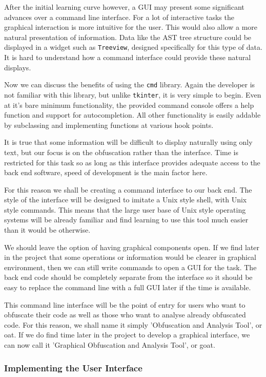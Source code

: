 \documentclass{report}
\begin{document}
After the initial learning curve however, a GUI may present some significant advances over a command line interface. For a lot of interactive
tasks the graphical interaction is more intuitive for the user. This would also allow a more natural presentation of information. Data like
the AST tree structure could be displayed in a widget such as \texttt{Treeview}, designed specifically for this type of data. It is hard to
understand how a command interface could provide these natural displays.

Now we can discuss the benefits of using the \texttt{cmd} library. Again the developer is not familiar with this library, but unlike
\texttt{tkinter}, it is very simple to begin. Even at it's bare minimum functionality, the provided command console offers a help
function and support for autocompletion. All other functionality is easily addable by subclassing and implementing functions at various
hook points.

It is true that some information will be difficult to display naturally using only text, but our focus is on the obfuscation rather than
the interface. Time is restricted for this task so as long as this interface provides adequate access to the back end software, speed
of development is the main factor here.

For this reason we shall be creating a command interface to our back end. The style of the interface will be designed to imitate a
Unix style shell, with Unix style commands. This means that the large user base of Unix style operating systems will be already familiar
and find learning to use this tool much easier than it would be otherwise.

We should leave the option of having graphical components open. If we find later in the project that some operations or information would
be clearer in graphical environment, then we can still write commands to open a GUI for the task. The back end code should be completely
separate from the interface so it should be easy to replace the command line with a full GUI later if the time is available.

This command line interface will be the point of entry for users who want to obfuscate their code as well as those who want to analyse
already obfuscated code. For this reason, we shall name it simply 'Obfuscation and Analysis Tool', or oat. If we do find time later in
the project to develop a graphical interface, we can now call it 'Graphical Obfuscation and Analysis Tool', or goat.

\subsubsection{Implementing the User Interface}
\end{document}
